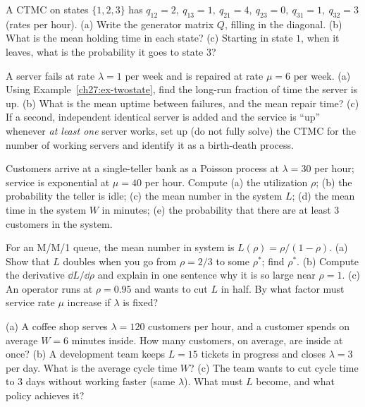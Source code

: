 \begin{exercise}
\label{ch27:exr-readgen}
A CTMC on states $\{1,2,3\}$ has $q_{12}=2,\ q_{13}=1,\ q_{21}=4,\ q_{23}=0,\ q_{31}=1,\ q_{32}=3$
(rates per hour). (a) Write the generator matrix $Q$, filling in the diagonal. (b) What is the mean
holding time in each state? (c) Starting in state $1$, when it leaves, what is the probability it
goes to state $3$?
\end{exercise}

\begin{exercise}
\label{ch27:exr-availability}
A server fails at rate $\lambda = 1$ per week and is repaired at rate $\mu = 6$ per week. (a) Using
Example~\ref{ch27:ex-twostate}, find the long-run fraction of time the server is up. (b) What is the
mean uptime between failures, and the mean repair time? (c) If a second, independent identical server
is added and the service is ``up'' whenever \emph{at least one} server works, set up (do not fully
solve) the CTMC for the number of working servers and identify it as a birth-death process.
\end{exercise}

\begin{exercise}[M/M/1 numbers]
\label{ch27:exr-mm1numbers}
Customers arrive at a single-teller bank as a Poisson process at $\lambda = 30$ per hour; service is
exponential at $\mu = 40$ per hour. Compute (a) the utilization $\rho$; (b) the probability the
teller is idle; (c) the mean number in the system $L$; (d) the mean time in the system $W$ in
minutes; (e) the probability that there are at least $3$ customers in the system.
\end{exercise}

\begin{exercise}
\label{ch27:exr-cliff}
For an M/M/1 queue, the mean number in system is $L(\rho) = \rho/(1-\rho)$. (a) Show that $L$ doubles
when you go from $\rho = 2/3$ to some $\rho^*$; find $\rho^*$. (b) Compute the derivative
$\dd L/\dd\rho$ and explain in one sentence why it is so large near $\rho = 1$. (c) An operator runs
at $\rho = 0.95$ and wants to cut $L$ in half. By what factor must service rate $\mu$ increase if
$\lambda$ is fixed?
\end{exercise}

\begin{exercise}
\label{ch27:exr-little}
(a) A coffee shop serves $\lambda = 120$ customers per hour, and a customer spends on average
$W = 6$ minutes inside. How many customers, on average, are inside at once? (b) A development team
keeps $L = 15$ tickets in progress and closes $\lambda = 3$ per day. What is the average cycle time
$W$? (c) The team wants to cut cycle time to $3$ days without working faster (same $\lambda$). What
must $L$ become, and what policy achieves it?
\end{exercise}

